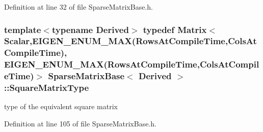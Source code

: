 Definition at line 32 of file Sparse\-Matrix\-Base.\-h.

\hypertarget{class_sparse_matrix_base_a1e066d0be742876aaf43a895c98899fc}{
\subsubsection[{Square\-Matrix\-Type}]{\setlength{\rightskip}{0pt plus 5cm}template$<$typename Derived$>$ typedef {\bf Matrix}$<${\bf Scalar},E\-I\-G\-E\-N\-\_\-\-E\-N\-U\-M\-\_\-\-M\-A\-X({\bf Rows\-At\-Compile\-Time},{\bf Cols\-At\-Compile\-Time}), E\-I\-G\-E\-N\-\_\-\-E\-N\-U\-M\-\_\-\-M\-A\-X({\bf Rows\-At\-Compile\-Time},{\bf Cols\-At\-Compile\-Time})$>$ {\bf Sparse\-Matrix\-Base}$<$ Derived $>$\-::{\bf Square\-Matrix\-Type}}}\label{class_sparse_matrix_base_a1e066d0be742876aaf43a895c98899fc}
type of the equivalent square matrix 

Definition at line 105 of file Sparse\-Matrix\-Base.\-h.




